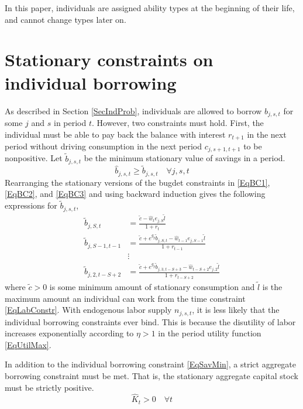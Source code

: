 \documentclass[letterpaper,12pt]{article}
\theoremstyle{definition}
\begin{document}
  In this paper, individuals are assigned ability types at the beginning of their life, and cannot change types later on.


\newpage
\section{Stationary constraints on individual borrowing}\label{AppBorConstr}

  \setcounter{equation}{0}

  As described in Section \ref{SecIndProb}, individuals are allowed to borrow $b_{j,s,t}$ for some $j$ and $s$ in period $t$. However, two constraints must hold. First, the individual must be able to pay back the balance with interest $r_{t+1}$ in the next period without driving consumption in the next period $c_{j,s+1,t+1}$ to be nonpositive. Let $\tilde{b}_{j,s,t}$ be the minimum stationary value of savings in a period.
  \begin{equation}\label{EqSavMin}
    \hat{b}_{j,s,t}\geq\tilde{b}_{j,s,t} \quad\forall j,s,t
  \end{equation}
  Rearranging the stationary versions of the bugdet constraints in \eqref{EqBC1}, \eqref{EqBC2}, and \eqref{EqBC3} and using backward induction gives the following expressions for $\tilde{b}_{j,s,t}$,
  \begin{equation}\label{EqBorConsts}
    \begin{split}
      \tilde{b}_{j,S,t} &= \frac{\tilde{c} - \hat{w}_t e_{j,S}\tilde{l}}{1+r_t}  \\
      \tilde{b}_{j,S-1,t-1} &= \frac{\tilde{c} + e^{g_y}\tilde{b}_{j,S,t} - \hat{w}_{t-1}e_{j,S-1}\tilde{l}}{1+r_{t-1}} \\
      &\vdots \\
      \tilde{b}_{j,2,t-S+2} &= \frac{\tilde{c} + e^{g_y}\tilde{b}_{j,3,t-S+3} - \hat{w}_{t-S+2}e_{j,2}\tilde{l}}{1+r_{t-S+2}}
    \end{split}
  \end{equation}
  where $\tilde{c}>0$ is some minimum amount of stationary consumption and $\tilde{l}$ is the maximum amount an individual can work from the time constraint \eqref{EqLabConstr}. With endogenous labor supply $n_{j,s,t}$, it is less likely that the individual borrowing constraints ever bind. This is because the disutility of labor increases exponentially according to $\eta>1$ in the period utility function \eqref{EqUtilMax}.

  In addition to the individual borrowing constraint \eqref{EqSavMin}, a strict aggregate borrowing constraint must be met. That is, the stationary aggregate capital stock must be strictly positive.
  \begin{equation}\label{EqAggrCapConstr}
    \hat{K}_t > 0 \quad\forall t
  \end{equation}
\end{document}
